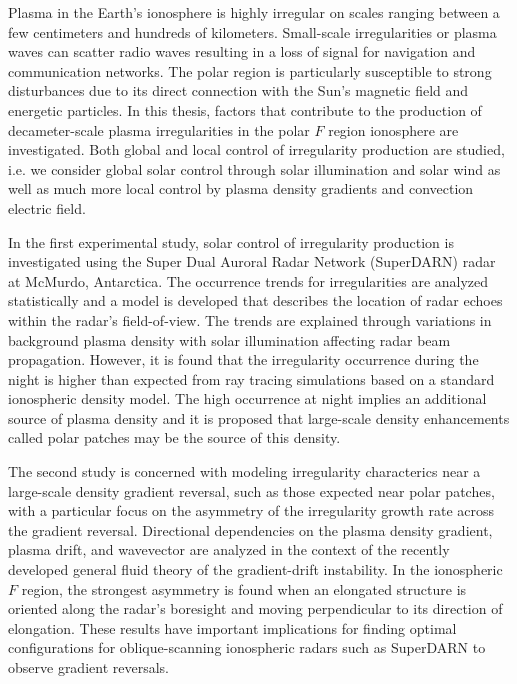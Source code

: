 
Plasma in the Earth's ionosphere is highly irregular on scales ranging between a few centimeters and hundreds of kilometers.  Small-scale irregularities or plasma waves can scatter radio waves resulting in a loss of signal for navigation and communication networks.  The polar region is particularly susceptible to strong disturbances due to its direct connection with the Sun's magnetic field and energetic particles.  In this thesis, factors that contribute to the production of decameter-scale plasma irregularities in the polar \(F\) region ionosphere are investigated.  Both global and local control of irregularity production are studied, i.e. we consider global solar control through solar illumination and solar wind as well as much more local control by plasma density gradients and convection electric field.

In the first experimental study, solar control of irregularity production is investigated using the Super Dual Auroral Radar Network (SuperDARN) radar at McMurdo, Antarctica.  The occurrence trends for irregularities are analyzed statistically and a model is developed that describes the location of radar echoes within the radar's field-of-view.  The trends are explained through variations in background plasma density with solar illumination affecting radar beam propagation.  However, it is found that the irregularity occurrence during the night is higher than expected from ray tracing simulations based on a standard ionospheric density model.  The high occurrence at night implies an additional source of plasma density and it is proposed that large-scale density enhancements called polar patches may be the source of this density.

The second study is concerned with modeling irregularity characterics near a large-scale density gradient reversal, such as those expected near polar patches, with a particular focus on the asymmetry of the irregularity growth rate across the gradient reversal.  Directional dependencies on the plasma density gradient, plasma drift, and wavevector are analyzed in the context of the recently developed general fluid theory of the gradient-drift instability.  In the ionospheric \(F\) region, the strongest asymmetry is found when an elongated structure is oriented along the radar's boresight and moving perpendicular to its direction of elongation.  These results have important implications for finding optimal configurations for oblique-scanning ionospheric radars such as SuperDARN to observe gradient reversals.


